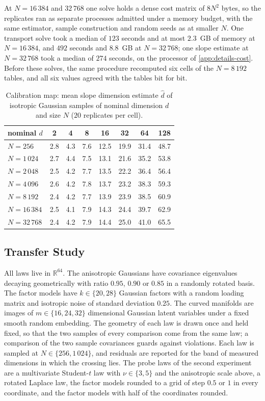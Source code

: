 \documentclass[twoside,11pt]{article}
\theoremstyle{plain}
\theoremstyle{definition}
\theoremstyle{remark}
\newcommand{\dhat}{\ensuremath{\hat{d}}}
\newcommand{\R}{\ensuremath{\mathbb{R}}}
\begin{document}
At $N = 16\,384$ and $32\,768$ one solve holds a dense cost matrix of
$8N^2$ bytes, so
the replicates ran as separate processes admitted under a memory budget,
with the same estimator, sample construction and random seeds as at
smaller $N$. One transport solve took a median of $123$ seconds and at
most $2.3$~GB of memory at $N = 16\,384$, and $492$ seconds and $8.8$~GB
at $N = 32\,768$; one slope estimate at $N = 32\,768$ took a median of
$274$ seconds, on the processor of \cref{app:details-cost}. Before
these solves, the same procedure recomputed six cells of the $N = 8\,192$
tables, and all six values agreed with the tables bit for bit.

\begin{table}[htbp]
\centering
\small
\begin{tabular}{lccccccc}
\toprule
nominal $d$ & 2 & 4 & 8 & 16 & 32 & 64 & 128 \\
\midrule
$N = 256$ & 2.8 & 4.3 & 7.6 & 12.5 & 19.9 & 31.4 & 48.7 \\
$N = 1\,024$ & 2.7 & 4.4 & 7.5 & 13.1 & 21.6 & 35.2 & 53.8 \\
$N = 2\,048$ & 2.5 & 4.2 & 7.7 & 13.5 & 22.2 & 36.4 & 56.4 \\
$N = 4\,096$ & 2.6 & 4.2 & 7.8 & 13.7 & 23.2 & 38.3 & 59.3 \\
$N = 8\,192$ & 2.4 & 4.2 & 7.7 & 13.9 & 23.9 & 38.5 & 60.9 \\
$N = 16\,384$ & 2.5 & 4.1 & 7.9 & 14.3 & 24.4 & 39.7 & 62.9 \\
$N = 32\,768$ & 2.4 & 4.2 & 7.9 & 14.4 & 25.0 & 41.0 & 65.5 \\
\bottomrule
\end{tabular}
\caption{Calibration map: mean slope dimension estimate $\dhat$ of
isotropic Gaussian samples of nominal dimension $d$ and size $N$
($20$ replicates per cell).}\label{tab:dhat}
\end{table}

\subsection{Transfer Study}\label{app:details-transfer}

All laws live in $\R^{64}$. The anisotropic Gaussians have covariance
eigenvalues decaying geometrically with ratio $0.95$, $0.90$ or $0.85$ in a
randomly rotated basis. The factor models have $k \in \{20, 28\}$ Gaussian
factors with a random loading matrix and isotropic noise of standard
deviation $0.25$. The curved manifolds are images of $m \in \{16, 24, 32\}$
dimensional Gaussian latent variables under a fixed smooth random
embedding. The geometry of each law is drawn once and held fixed, so that
the two samples of every comparison come from the same law; a comparison of
the two sample covariances guards against violations. Each law is sampled
at $N \in \{256, 1\,024\}$, and residuals are reported for the band of
measured dimensions in which the crossing lies. The probe laws of the second
experiment are a multivariate Student-$t$ law with $\nu \in \{3, 5\}$ and the
anisotropic scale above, a rotated Laplace law, the factor models rounded to
a grid of step $0.5$ or $1$ in every coordinate, and the factor models with
half of the coordinates rounded.
\end{document}
